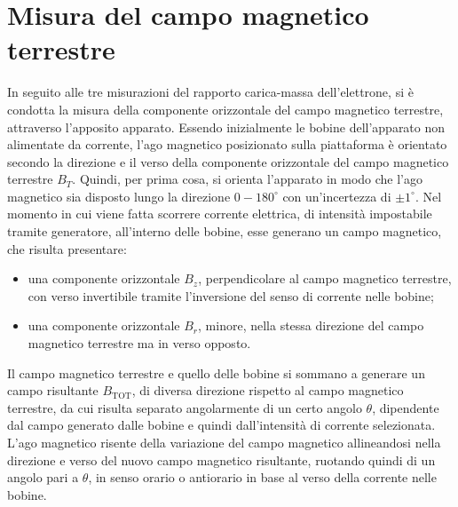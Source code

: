 \documentclass[a4paper,12pt]{article}
\begin{document}
\section{Misura del campo magnetico terrestre}

In seguito alle tre misurazioni del rapporto carica-massa dell’elettrone, si è condotta la misura della componente orizzontale del campo magnetico terrestre, attraverso l’apposito apparato.
Essendo inizialmente le bobine dell’apparato non alimentate da corrente, l’ago magnetico posizionato sulla piattaforma è orientato secondo la direzione e il verso della componente orizzontale del campo magnetico terrestre \( B_T \). Quindi, per prima cosa, si orienta l’apparato in modo che l’ago magnetico sia disposto lungo la direzione \( 0-180^\circ \) con un’incertezza di \( \pm 1^\circ \).
Nel momento in cui viene fatta scorrere corrente elettrica, di intensità impostabile tramite generatore, all’interno delle bobine, esse generano un campo magnetico, che risulta presentare:
\begin{itemize}
    \item una componente orizzontale \( B_z \), perpendicolare al campo magnetico terrestre, con verso invertibile tramite l’inversione del senso di corrente nelle bobine;
    \item una componente orizzontale \( B_r \), minore, nella stessa direzione del campo magnetico terrestre ma in verso opposto.
\end{itemize}

Il campo magnetico terrestre e quello delle bobine si sommano a generare un campo risultante \( B_{\text{TOT}} \), di diversa direzione rispetto al campo magnetico terrestre, da cui risulta separato angolarmente di un certo angolo \( \theta \), dipendente dal campo generato dalle bobine e quindi dall’intensità di corrente selezionata.
L’ago magnetico risente della variazione del campo magnetico allineandosi nella direzione e verso del nuovo campo magnetico risultante, ruotando quindi di un angolo pari a \( \theta \), in senso orario o antiorario in base al verso della corrente nelle bobine.
\end{document}
